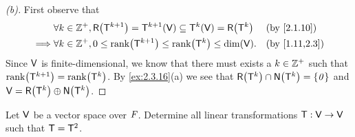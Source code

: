 \begin{proof}[(b)]
  First observe that
  \begin{align*}
             & \forall k \in \Z^+, \rg{\T^{k + 1}} = \T^{k + 1}(\V) \subseteq \T^k(\V) = \rg{\T^k} &  & \text{(by \cref{2.1.10})}   \\
    \implies & \forall k \in \Z^+, 0 \leq \rk{\T^{k + 1}} \leq \rk{\T^k} \leq \dim(\V).            &  & \text{(by \cref{1.11,2.3})}
  \end{align*}
  Since \(\mathsf{V}\) is finite-dimensional, we know that there must exists a \(k \in \mathbb{Z}^+\) such that \(\rk{\T^{k + 1}} = \rk{\T^k}\).
  By \cref{ex:2.3.16}(a) we see that \(\rg{\T^k} \cap \ns{\T^k} = \set{\zv}\) and \(\V = \rg{\T^k} \oplus \ns{\T^k}\).
\end{proof}

\begin{ex}\label{ex:2.3.17}
  Let \(\mathsf{V}\) be a vector space over \(\mathit{F}\).
  Determine all linear transformations \(\mathsf{T} : \mathsf{V} \to \mathsf{V}\) such that \(\mathsf{T} = \mathsf{T}^2\).
\end{ex}

